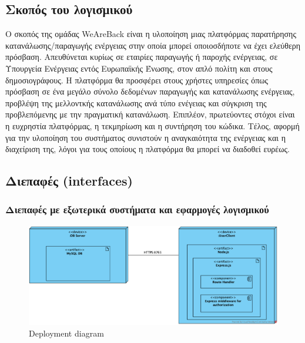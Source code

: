 \documentclass[a4paper,12pt, oneside]{article}
\begin{document}
\subsection{Σκοπός του λογισμικού}
O σκοπός της ομάδας \textlatin{WeAreBack} είναι η υλοποίηση μιας πλατφόρμας παρατήρησης κατανάλωσης/παραγωγής ενέργειας στην οποία μπορεί οποιοσδήποτε να έχει ελεύθερη πρόσβαση. Απευθύνεται κυρίως σε εταιρίες παραγωγής ή παροχής ενέργειας, σε Υπουργεία Ενέργειας εντός Ευρωπαϊκής Ένωσης, στον απλό πολίτη και στους δημοσιογράφους. Η πλατφόρμα θα προσφέρει στους χρήστες υπηρεσίες όπως πρόσβαση σε ένα μεγάλο σύνολο δεδομένων παραγωγής και κατανάλωσης ενέργειας, προβλέψη της μελλοντκής κατανάλωσης ανά τύπο ενέγειας και σύγκριση της προβλεπόμενης με την πραγματική κατανάλωση. Επιπλέον, πρωτεύοντες στόχοι είναι η ευχρηστία πλατφόρμας, η τεκμηρίωση και η συντήρηση του κώδικα. Τέλος, αφορμή για την υλοποίηση του συστήματος συνιστούν η αναγκαιότητα της ενέργειας και η διαχείριση της, λόγοι για τους οποίους η πλατφόρμα θα μπορεί να διαδοθεί ευρέως.


\subsection{Διεπαφές \textlatin{(interfaces)}}
\subsubsection{Διεπαφές με εξωτερικά συστήματα και εφαρμογές λογισμικού}

\begin{figure}[h]
\includegraphics[width=1\textwidth]{./UML/Deployment_Diagram.png}
\caption{\textlatin{Deployment diagram}}
\centering
\end{figure}

\clearpage
\end{document}
